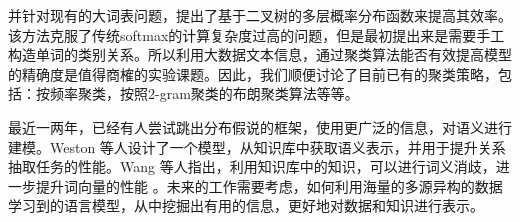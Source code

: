 \documentclass[12pt,a4paper]{article}
\begin{document}
并针对现有的大词表问题，提出了基于二叉树的多层概率分布函数来提高其效率。该方法克服了传统softmax的计算复杂度过高的问题，但是最初提出来是需要手工构造单词的类别关系。所以利用大数据文本信息，通过聚类算法能否有效提高模型的精确度是值得商榷的实验课题。因此，我们顺便讨论了目前已有的聚类策略，包括：按频率聚类，按照2-gram聚类的布朗聚类算法等等。


最近一两年，已经有人尝试跳出分布假说的框架，使用更广泛的信息，对语义进行建模。Weston 等人设计了一个模型，从知识库中获取语义表示，并用于提升关系抽取任务的性能\cite{DBLP:conf/emnlp/WestonBYU13}。Wang 等人指出，利用知识库中的知识，可以进行词义消歧，进一步提升词向量的性能 \cite{DBLP:conf/emnlp/2014}。未来的工作需要考虑，如何利用海量的多源异构的数据学习到的语言模型，从中挖掘出有用的信息，更好地对数据和知识进行表示。
\newpage
{}

\end{document}

